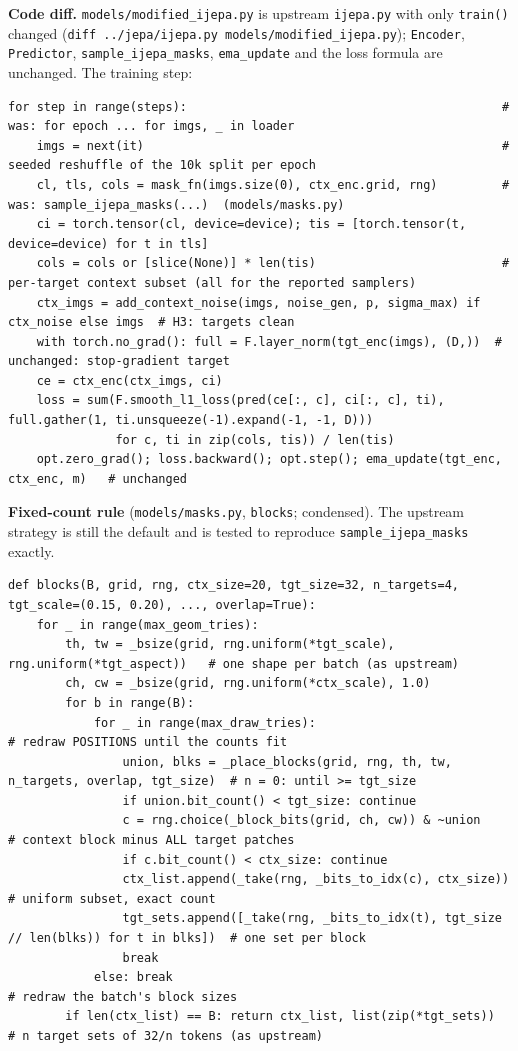 \textbf{Code diff.} \texttt{models/modified\_ijepa.py} is upstream \texttt{ijepa.py} with only \texttt{train()} changed
(\texttt{diff ../jepa/ijepa.py models/modified\_ijepa.py}); \texttt{Encoder}, \texttt{Predictor},
\texttt{sample\_ijepa\_masks}, \texttt{ema\_update} and the loss formula are unchanged. The training step:
\begin{lstlisting}
for step in range(steps):                                            # was: for epoch ... for imgs, _ in loader
    imgs = next(it)                                                  # seeded reshuffle of the 10k split per epoch
    cl, tls, cols = mask_fn(imgs.size(0), ctx_enc.grid, rng)         # was: sample_ijepa_masks(...)  (models/masks.py)
    ci = torch.tensor(cl, device=device); tis = [torch.tensor(t, device=device) for t in tls]
    cols = cols or [slice(None)] * len(tis)                          # per-target context subset (all for the reported samplers)
    ctx_imgs = add_context_noise(imgs, noise_gen, p, sigma_max) if ctx_noise else imgs  # H3: targets clean
    with torch.no_grad(): full = F.layer_norm(tgt_enc(imgs), (D,))  # unchanged: stop-gradient target
    ce = ctx_enc(ctx_imgs, ci)
    loss = sum(F.smooth_l1_loss(pred(ce[:, c], ci[:, c], ti), full.gather(1, ti.unsqueeze(-1).expand(-1, -1, D)))
               for c, ti in zip(cols, tis)) / len(tis)
    opt.zero_grad(); loss.backward(); opt.step(); ema_update(tgt_enc, ctx_enc, m)   # unchanged
\end{lstlisting}
\textbf{Fixed-count rule} (\texttt{models/masks.py}, \texttt{blocks}; condensed). The upstream strategy is still the
default and is tested to reproduce \texttt{sample\_ijepa\_masks} exactly.
\begin{lstlisting}
def blocks(B, grid, rng, ctx_size=20, tgt_size=32, n_targets=4, tgt_scale=(0.15, 0.20), ..., overlap=True):
    for _ in range(max_geom_tries):
        th, tw = _bsize(grid, rng.uniform(*tgt_scale), rng.uniform(*tgt_aspect))   # one shape per batch (as upstream)
        ch, cw = _bsize(grid, rng.uniform(*ctx_scale), 1.0)
        for b in range(B):
            for _ in range(max_draw_tries):                           # redraw POSITIONS until the counts fit
                union, blks = _place_blocks(grid, rng, th, tw, n_targets, overlap, tgt_size)  # n = 0: until >= tgt_size
                if union.bit_count() < tgt_size: continue
                c = rng.choice(_block_bits(grid, ch, cw)) & ~union     # context block minus ALL target patches
                if c.bit_count() < ctx_size: continue
                ctx_list.append(_take(rng, _bits_to_idx(c), ctx_size))          # uniform subset, exact count
                tgt_sets.append([_take(rng, _bits_to_idx(t), tgt_size // len(blks)) for t in blks])  # one set per block
                break
            else: break                                               # redraw the batch's block sizes
        if len(ctx_list) == B: return ctx_list, list(zip(*tgt_sets))   # n target sets of 32/n tokens (as upstream)
\end{lstlisting}
